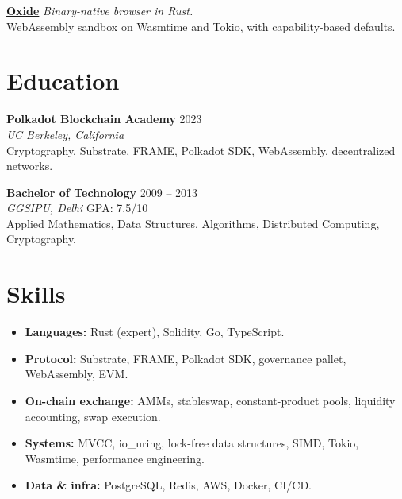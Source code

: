 \documentclass[10pt,a4paper]{article}
\newcommand{\edu}[5]{%
    \textbf{#1} \hfill {\color{muted}\small #2}\\
    \textit{#3} \hfill {\color{muted}\small #4}\\
    {\footnotesize #5}\\
    \vspace{1pt}
}
\newenvironment{bullets}{%
  \begin{itemize}[leftmargin=14pt, itemsep=0.5pt, parsep=0pt, topsep=1pt]%
}{\end{itemize}}
\begin{document}
\vspace{2pt}
\textbf{\href{https://github.com/niklabh/oxide}{Oxide}} \hfill \textit{Binary-native browser in Rust.}\\
WebAssembly sandbox on Wasmtime and Tokio, with capability-based defaults.

\section{Education}

\edu{Polkadot Blockchain Academy}{2023}{UC Berkeley, California}{}{Cryptography, Substrate, FRAME, Polkadot SDK, WebAssembly, decentralized networks.}

\edu{Bachelor of Technology}{2009 -- 2013}{GGSIPU, Delhi}{GPA: 7.5/10}{Applied Mathematics, Data Structures, Algorithms, Distributed Computing, Cryptography.}

\section{Skills}

\begin{bullets}
    \item \textbf{Languages:} Rust (expert), Solidity, Go, TypeScript.
    \item \textbf{Protocol:} Substrate, FRAME, Polkadot SDK, governance pallet, WebAssembly, EVM.
    \item \textbf{On-chain exchange:} AMMs, stableswap, constant-product pools, liquidity accounting, swap execution.
    \item \textbf{Systems:} MVCC, io\_uring, lock-free data structures, SIMD, Tokio, Wasmtime, performance engineering.
    \item \textbf{Data \& infra:} PostgreSQL, Redis, AWS, Docker, CI/CD.
\end{bullets}
\end{document}
